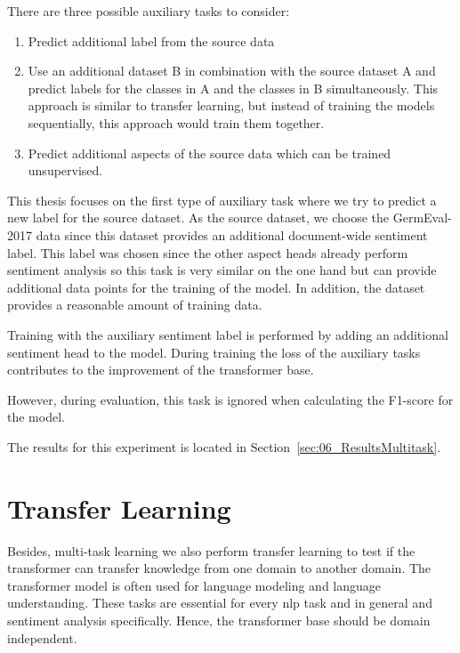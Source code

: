 There are three possible auxiliary tasks to consider:


\begin{enumerate}
    \item Predict additional label from the source data
    \item Use an additional dataset B in combination with the source dataset A and predict labels for the classes in A and the classes in B simultaneously. This approach is similar to transfer learning, but instead of training the models sequentially, this approach would train them together.
    \item Predict additional aspects of the source data which can be trained unsupervised.
\end{enumerate}

This thesis focuses on the first type of auxiliary task where we try to predict a new label for the source dataset. As the source dataset, we choose the GermEval-2017 data since this dataset provides an additional document-wide sentiment label. This label was chosen since the other aspect heads already perform sentiment analysis so this task is very similar on the one hand but can provide additional data points for the training of the model. In addition, the dataset provides a reasonable amount of training data.

Training with the auxiliary sentiment label is performed by adding an additional sentiment head to the model. During training the loss of the auxiliary tasks contributes to the improvement of the transformer base.

However, during evaluation, this task is ignored when calculating the F1-score for the model.
\medskip

The results for this experiment is located in Section~\ref{sec:06_ResultsMultitask}.



\section{Transfer Learning}
\label{sec:04_transferLearning}

Besides, multi-task learning we also perform transfer learning to test if the transformer can transfer knowledge from one domain to another domain. The transformer model is often used for language modeling and language understanding. These tasks are essential for every \gls{nlp} task and in general and sentiment analysis specifically. Hence, the transformer base should be domain independent. 
\medskip

